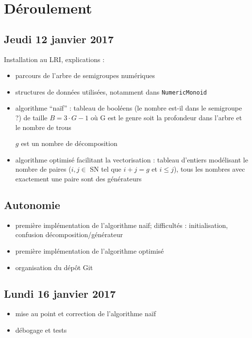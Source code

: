 \documentclass[12pt,a4paper]{article}
\let\leq\leqslant
\begin{document}
\section*{Déroulement}

\subsection*{Jeudi 12 janvier 2017}
Installation au LRI, explications :
\begin{itemize}
	\item	parcours de l'arbre de semigroupes numériques

	\item	structures de données utilisées, notamment dans \texttt{NumericMonoid}

	\item	algorithme ``naïf'' : tableau de booléens (le nombre est-il dans le semigroupe ?) de taille $B = 3 \cdot G - 1$ où G est le genre soit la profondeur dans l'arbre et le nombre de trous
			\begin{algorithmic}
								\STATE $g$ est un nombre de décomposition
							\ENDIF
						\ENDFOR
					\ENDIF
				\ENDFOR
			\end{algorithmic}

	\item	algorithme optimisé facilitant la vectorisation : tableau d'entiers modélisant le nom\-bre de paires ($i, j \in$ SN tel que $i + j = g$ et $i \leq j$), tous les nombres avec exactement une paire sont des générateurs
\end{itemize}

\subsection*{Autonomie}
\begin{itemize}
	\item	première implémentation de l'algorithme naïf; difficultés : initialisation, confusion décomposition/générateur
	\item	première implémentation de l'algorithme optimisé
	\item	organisation du dépôt Git
\end{itemize}

\subsection*{Lundi 16 janvier 2017}
\begin{itemize}
	\item	mise au point et correction de l'algorithme naïf
	\item	débogage et tests
\end{itemize}
\end{document}
